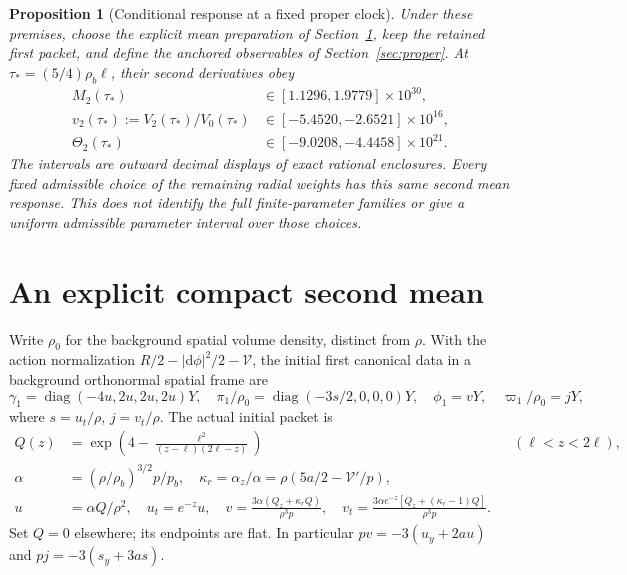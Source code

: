 \documentclass[11pt]{article}
\newcommand{\dd}{\mathrm d}
\newtheorem{proposition}{Proposition}
\begin{document}
\begin{proposition}[Conditional response at a fixed proper clock]
Under these premises, choose the explicit mean preparation of
Section~\ref{sec:preparation}, keep the retained first packet, and define
the anchored observables of Section~\ref{sec:proper}. At
$\tau_*=(5/4)\rho_b\ell$, their second derivatives obey
\begin{align}
 M_2(\tau_*)&\in[1.1296,1.9779]\times10^{30},\nonumber\\
 v_2(\tau_*):=V_2(\tau_*)/V_0(\tau_*)&\in[-5.4520,-2.6521]\times10^{16},
 \label{eq:main}\\
 \Theta_2(\tau_*)&\in[-9.0208,-4.4458]\times10^{21}.\nonumber
\end{align}
The intervals are outward decimal displays of exact rational enclosures.
Every fixed admissible choice of the remaining radial weights has this
same second mean response. This does not identify the full finite-parameter
families or give a uniform admissible parameter interval over those choices.
\end{proposition}

\section{An explicit compact second mean}\label{sec:preparation}

Write $\rho_0$ for the background spatial volume density, distinct from
$\rho$. With the action normalization $R/2-|\dd\phi|^2/2-\mathcal V$,
the initial first canonical data in a background orthonormal spatial frame
are
\begin{equation}
 \gamma_1=\operatorname{diag}(-4u,2u,2u,2u)Y,\quad
 \pi_1/\rho_0=\operatorname{diag}(-3s/2,0,0,0)Y,\quad
 \phi_1=vY,\quad \varpi_1/\rho_0=jY, \label{eq:first}
\end{equation}
where $s=u_t/\rho$, $j=v_t/\rho$. The actual initial packet is
\begin{align}
 Q(z)&=\exp\!\left(4-\frac{\ell^2}{(z-\ell)(2\ell-z)}\right)
 &&(\ell<z<2\ell), \label{eq:bump}\\
 \alpha&=(\rho/\rho_b)^{3/2}p/p_b,\quad
 \kappa_r=\alpha_z/\alpha=\rho(5a/2-\mathcal V'/p),\nonumber\\
 u&=\alpha Q/\rho^2,\quad u_t=e^{-z}u,\quad
 v=\frac{3\alpha(Q_z+\kappa_rQ)}{\rho^3p},\quad
 v_t=\frac{3\alpha e^{-z}[Q_z+(\kappa_r-1)Q]}{\rho^3p}.\nonumber
\end{align}
Set $Q=0$ elsewhere; its endpoints are flat. In particular
$pv=-3(u_y+2au)$ and $pj=-3(s_y+3as)$.
\end{document}

